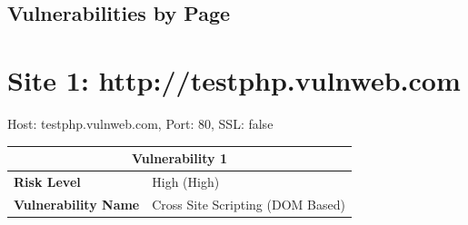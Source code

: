 \documentclass[12pt]{article}
\begin{document}
\subsection{Vulnerabilities by Page}
\section*{Site 1: http://testphp.vulnweb.com}
Host: testphp.vulnweb.com, Port: 80, SSL: false

\begin{center}
\renewcommand{\arraystretch}{1.3}
\begin{longtable}{|l|p{10cm}|}
\hline
\multicolumn{2}{|c|}{\textbf{Vulnerability 1}} \\
\hline
\textbf{Risk Level} & High (High) \\
\hline
\textbf{Vulnerability Name} & Cross Site Scripting (DOM Based) \\
\hline

\end{longtable}
\end{center}
\end{document}
